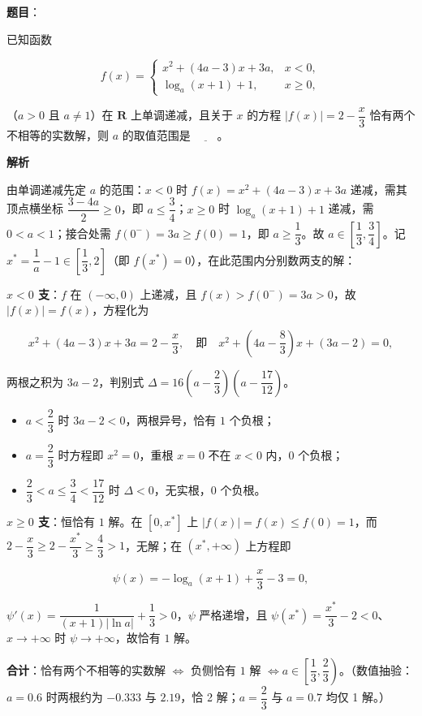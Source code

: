\begin{answer}

\textbf{题目}：

已知函数

\nopagebreak[4]
\[
f(x)=\begin{cases}
x^{2}+(4a-3)x+3a, & x<0,\\
\log_{a}(x+1)+1, & x\geqslant 0,
\end{cases}
\]

（\(a>0\) 且 \(a\neq 1\)）在 \(\mathbf{R}\) 上单调递减，且关于 \(x\) 的方程 \(|f(x)|=2-\dfrac{x}{3}\) 恰有两个不相等的实数解，则 \(a\) 的取值范围是 \(\underline{\qquad}\)。

\textbf{解析}

由单调递减先定 \(a\) 的范围：\(x<0\) 时 \(f(x)=x^{2}+(4a-3)x+3a\) 递减，需其顶点横坐标 \(\dfrac{3-4a}{2}\geqslant 0\)，即 \(a\leqslant\dfrac{3}{4}\)；\(x\geqslant 0\) 时 \(\log_{a}(x+1)+1\) 递减，需 \(0<a<1\)；接合处需 \(f(0^{-})=3a\geqslant f(0)=1\)，即 \(a\geqslant\dfrac{1}{3}\)。故 \(a\in\left[\dfrac{1}{3},\dfrac{3}{4}\right]\)。记 \(x^{*}=\dfrac{1}{a}-1\in\left[\dfrac{1}{3},2\right]\)（即 \(f(x^{*})=0\)），在此范围内分别数两支的解：

\textbf{\(x<0\) 支}：\(f\) 在 \((-\infty,0)\) 上递减，且 \(f(x)>f(0^{-})=3a>0\)，故 \(|f(x)|=f(x)\)，方程化为

\nopagebreak[4]
\[
x^{2}+(4a-3)x+3a=2-\dfrac{x}{3},\quad\text{即}\quad x^{2}+\left(4a-\dfrac{8}{3}\right)x+(3a-2)=0,
\]

两根之积为 \(3a-2\)，判别式 \(\Delta=16\left(a-\dfrac{2}{3}\right)\left(a-\dfrac{17}{12}\right)\)。

\begin{itemize}
\item \(a<\dfrac{2}{3}\) 时 \(3a-2<0\)，两根异号，恰有 \(1\) 个负根；
\item \(a=\dfrac{2}{3}\) 时方程即 \(x^{2}=0\)，重根 \(x=0\) 不在 \(x<0\) 内，\(0\) 个负根；
\item \(\dfrac{2}{3}<a\leqslant\dfrac{3}{4}<\dfrac{17}{12}\) 时 \(\Delta<0\)，无实根，\(0\) 个负根。
\end{itemize}

\textbf{\(x\geqslant 0\) 支}：恒恰有 \(1\) 解。在 \([0,x^{*}]\) 上 \(|f(x)|=f(x)\leqslant f(0)=1\)，而 \(2-\dfrac{x}{3}\geqslant 2-\dfrac{x^{*}}{3}\geqslant\dfrac{4}{3}>1\)，无解；在 \((x^{*},+\infty)\) 上方程即

\nopagebreak[4]
\[
\psi(x)=-\log_{a}(x+1)+\dfrac{x}{3}-3=0,
\]

\(\psi'(x)=\dfrac{1}{(x+1)|\ln a|}+\dfrac{1}{3}>0\)，\(\psi\) 严格递增，且 \(\psi(x^{*})=\dfrac{x^{*}}{3}-2<0\)、\(x\to+\infty\) 时 \(\psi\to+\infty\)，故恰有 \(1\) 解。

\textbf{合计}：恰有两个不相等的实数解 \(\iff\) 负侧恰有 \(1\) 解 \(\iff a\in\left[\dfrac{1}{3},\dfrac{2}{3}\right)\)。（数值抽验：\(a=0.6\) 时两根约为 \(-0.333\) 与 \(2.19\)，恰 2 解；\(a=\dfrac{2}{3}\) 与 \(a=0.7\) 均仅 1 解。）

\gkanswer{答案：\(\left[\dfrac{1}{3},\dfrac{2}{3}\right)\)}

\end{answer}
